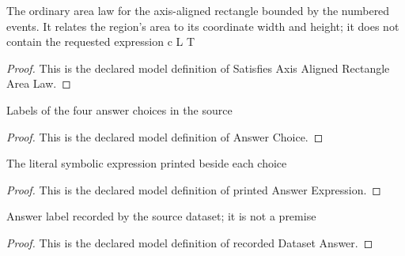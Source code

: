 \begin{definition}
  \label{def:physics:phyx-mini-0610:phyxminiproblems-problemphyxmini0610-satisfiesaxisalignedrectanglearealaw}
  The ordinary area law for the axis-aligned rectangle bounded by the numbered events. It relates the region's area to its coordinate width and height; it does not contain the requested expression c L T
\end{definition}
\begin{proof}
  This is the declared model definition of Satisfies Axis Aligned Rectangle Area Law.
\end{proof}
\begin{definition}
  \label{def:physics:phyx-mini-0610:phyxminiproblems-problemphyxmini0610-answerchoice}
  Labels of the four answer choices in the source
\end{definition}
\begin{proof}
  This is the declared model definition of Answer Choice.
\end{proof}
\begin{definition}
  \label{def:physics:phyx-mini-0610:phyxminiproblems-problemphyxmini0610-printedanswerexpression}
  The literal symbolic expression printed beside each choice
\end{definition}
\begin{proof}
  This is the declared model definition of printed Answer Expression.
\end{proof}
\begin{definition}
  \label{def:physics:phyx-mini-0610:phyxminiproblems-problemphyxmini0610-recordeddatasetanswer}
  Answer label recorded by the source dataset; it is not a premise
\end{definition}
\begin{proof}
  This is the declared model definition of recorded Dataset Answer.
\end{proof}
